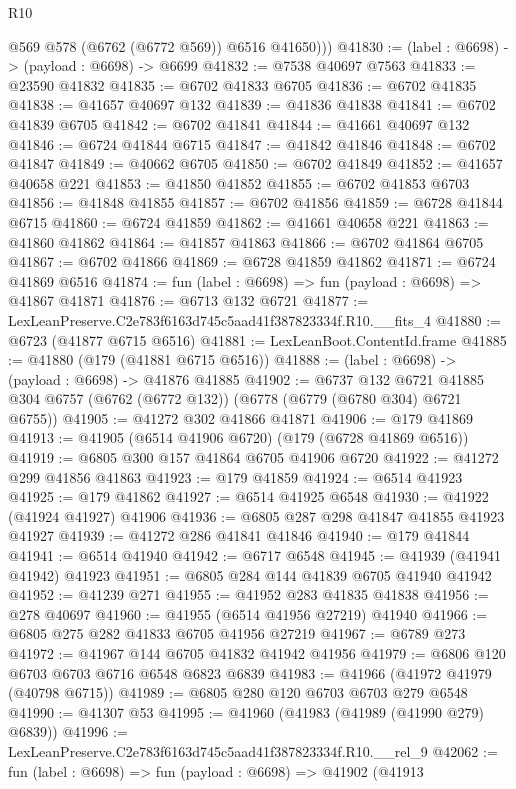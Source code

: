 \begin{lexlean}{R10}
\begin{coremodule}
          @569
          @578
          (@6762 (@6772 @569))
          @6516
          @41650)))
@41830 := (label : @6698) -> (payload : @6698) -> @6699
@41832 := @7538 @40697 @7563
@41833 := @23590 @41832
@41835 := @6702 @41833 @6705
@41836 := @6702 @41835
@41838 := @41657 @40697 @132
@41839 := @41836 @41838
@41841 := @6702 @41839 @6705
@41842 := @6702 @41841
@41844 := @41661 @40697 @132
@41846 := @6724 @41844 @6715
@41847 := @41842 @41846
@41848 := @6702 @41847
@41849 := @40662 @6705
@41850 := @6702 @41849
@41852 := @41657 @40658 @221
@41853 := @41850 @41852
@41855 := @6702 @41853 @6703
@41856 := @41848 @41855
@41857 := @6702 @41856
@41859 := @6728 @41844 @6715
@41860 := @6724 @41859
@41862 := @41661 @40658 @221
@41863 := @41860 @41862
@41864 := @41857 @41863
@41866 := @6702 @41864 @6705
@41867 := @6702 @41866
@41869 := @6728 @41859 @41862
@41871 := @6724 @41869 @6516
@41874 := fun (label : @6698) => fun (payload : @6698) => @41867 @41871
@41876 := @6713 @132 @6721
@41877 := LexLeanPreserve.C2e783f6163d745c5aad41f387823334f.R10.__fits_4
@41880 := @6723 (@41877 @6715 @6516)
@41881 := LexLeanBoot.ContentId.frame
@41885 := @41880 (@179 (@41881 @6715 @6516))
@41888 := (label : @6698) -> (payload : @6698) -> @41876 @41885
@41902 := @6737
    @132
    @6721
    @41885
    @304
    @6757
    (@6762 (@6772 @132))
    (@6778 (@6779 (@6780 @304) @6721 @6755))
@41905 := @41272 @302 @41866 @41871
@41906 := @179 @41869
@41913 := @41905 (@6514 @41906 @6720) (@179 (@6728 @41869 @6516))
@41919 := @6805 @300 @157 @41864 @6705 @41906 @6720
@41922 := @41272 @299 @41856 @41863
@41923 := @179 @41859
@41924 := @6514 @41923
@41925 := @179 @41862
@41927 := @6514 @41925 @6548
@41930 := @41922 (@41924 @41927) @41906
@41936 := @6805 @287 @298 @41847 @41855 @41923 @41927
@41939 := @41272 @286 @41841 @41846
@41940 := @179 @41844
@41941 := @6514 @41940
@41942 := @6717 @6548
@41945 := @41939 (@41941 @41942) @41923
@41951 := @6805 @284 @144 @41839 @6705 @41940 @41942
@41952 := @41239 @271
@41955 := @41952 @283 @41835 @41838
@41956 := @278 @40697
@41960 := @41955 (@6514 @41956 @27219) @41940
@41966 := @6805 @275 @282 @41833 @6705 @41956 @27219
@41967 := @6789 @273
@41972 := @41967 @144 @6705 @41832 @41942 @41956
@41979 := @6806 @120 @6703 @6703 @6716 @6548 @6823 @6839
@41983 := @41966 (@41972 @41979 (@40798 @6715))
@41989 := @6805 @280 @120 @6703 @6703 @279 @6548
@41990 := @41307 @53
@41995 := @41960 (@41983 (@41989 (@41990 @279) @6839))
@41996 := LexLeanPreserve.C2e783f6163d745c5aad41f387823334f.R10.__rel_9
@42062 := fun (label : @6698) =>
  fun (payload : @6698) =>
  @41902
    (@41913

\end{coremodule}
\end{lexlean}
